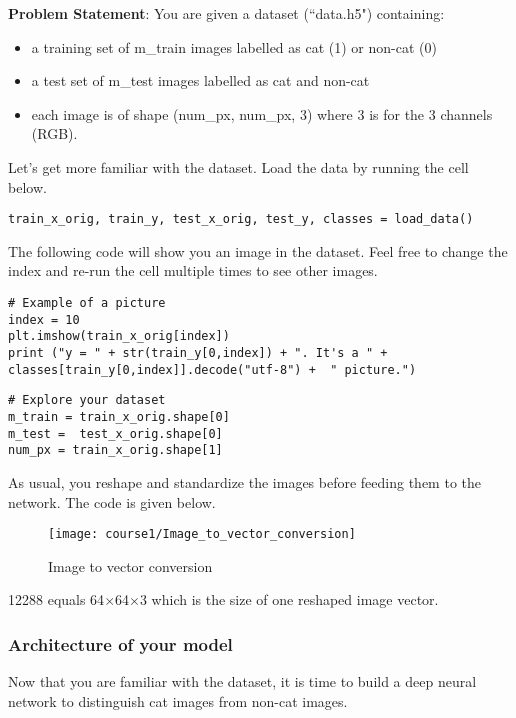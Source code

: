 {\textbf {Problem Statement}}: You are given a dataset (``data.h5") containing:
\begin{itemize}
\item a training set of m\_train images labelled as cat (1) or non-cat (0)
\item a test set of m\_test images labelled as cat and non-cat
\item each image is of shape (num\_px, num\_px, 3) where 3 is for the 3 channels (RGB).
\end{itemize}

Let's get more familiar with the dataset. Load the data by running the cell below.
\begin{verbatim}
train_x_orig, train_y, test_x_orig, test_y, classes = load_data()
\end{verbatim}

The following code will show you an image in the dataset. Feel free to change the index and re-run the cell multiple times to see other images.
\begin{verbatim}
# Example of a picture
index = 10
plt.imshow(train_x_orig[index])
print ("y = " + str(train_y[0,index]) + ". It's a " + classes[train_y[0,index]].decode("utf-8") +  " picture.")
\end{verbatim}

\begin{verbatim}
# Explore your dataset 
m_train = train_x_orig.shape[0]
m_test =  test_x_orig.shape[0]
num_px = train_x_orig.shape[1]
\end{verbatim}

As usual, you reshape and standardize the images before feeding them to the network. The code is given below.
\begin{figure}[h]
\begin{center}
\texttt{[image: course1/Image\_to\_vector\_conversion]}
\caption{Image to vector conversion}
\end{center}
\end{figure}

12288  equals 64$\times$64$\times$3 which is the size of one reshaped image vector.


\subsubsection{Architecture of your model}

Now that you are familiar with the dataset, it is time to build a deep neural network to distinguish cat images from non-cat images.

